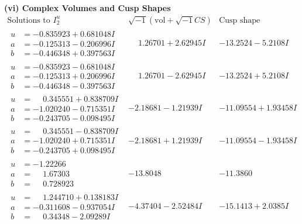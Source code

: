 \documentclass[1p]{elsarticle_modified}
\theoremstyle{definition}
\newcommand{\I}{\sqrt{-1}}
\begin{document}
\newpage\flushleft \textbf{(vi) Complex Volumes and Cusp Shapes}
$$\begin{array}{c|c|c}  
\text{Solutions to }I^u_{2}& \I (\text{vol} + \sqrt{-1}CS) & \text{Cusp shape}\\
 \hline 
\begin{aligned}
u &= -0.835923 + 0.681048 I \\
a &= -0.125313 - 0.206996 I \\
b &= -0.446348 + 0.397563 I\end{aligned}
 & \phantom{-}1.26701 + 2.62945 I & -13.2524 - 5.2108 I \\ \hline\begin{aligned}
u &= -0.835923 - 0.681048 I \\
a &= -0.125313 + 0.206996 I \\
b &= -0.446348 - 0.397563 I\end{aligned}
 & \phantom{-}1.26701 - 2.62945 I & -13.2524 + 5.2108 I \\ \hline\begin{aligned}
u &= \phantom{-}0.345551 + 0.838709 I \\
a &= -1.020240 - 0.715351 I \\
b &= -0.243705 - 0.098495 I\end{aligned}
 & -2.18681 - 1.21939 I & -11.09554 + 1.93458 I \\ \hline\begin{aligned}
u &= \phantom{-}0.345551 - 0.838709 I \\
a &= -1.020240 + 0.715351 I \\
b &= -0.243705 + 0.098495 I\end{aligned}
 & -2.18681 + 1.21939 I & -11.09554 - 1.93458 I \\ \hline\begin{aligned}
u &= -1.22266\phantom{ +0.000000I} \\
a &= \phantom{-}1.67303\phantom{ +0.000000I} \\
b &= \phantom{-}0.728923\phantom{ +0.000000I}\end{aligned}
 & -13.8048\phantom{ +0.000000I} & -11.3860\phantom{ +0.000000I} \\ \hline\begin{aligned}
u &= \phantom{-}1.244710 + 0.138183 I \\
a &= -0.311608 - 0.937054 I \\
b &= \phantom{-}0.34348 - 2.09289 I\end{aligned}
 & -4.37404 - 2.52484 I & -15.1413 + 2.0385 I \\ \hline\begin{aligned}

\end{aligned}
\end{array}$$
\end{document}

